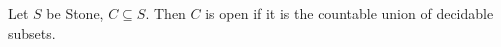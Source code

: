 %
%  
%
%
%
%
%
%
%  
\begin{definition}
  Let $S$ be Stone, $C\subseteq S$. 
  Then $C$ is open if it is the countable union of decidable subsets. 
\end{definition}
